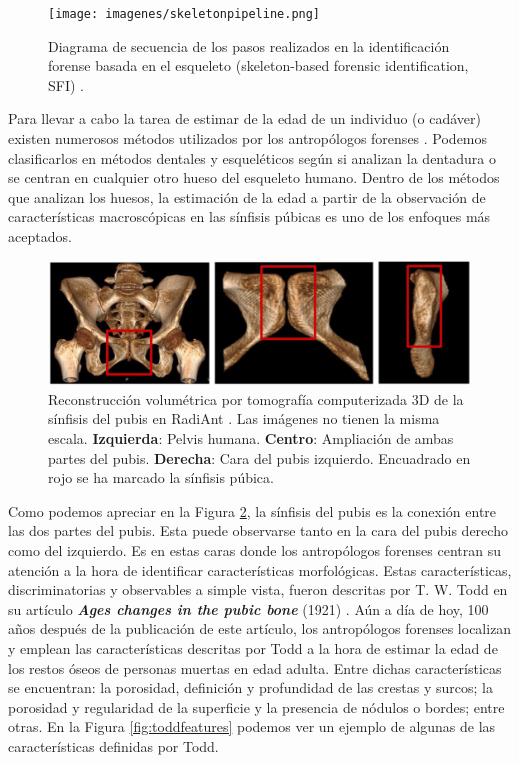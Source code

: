 \begin{figure}[ht!]
    \centering
    \texttt{[image: imagenes/skeletonpipeline.png]}
    \caption[Diagrama de secuencia de los pasos realizados en la identificación forense basada en el esqueleto.]{Diagrama de secuencia de los pasos realizados en la identificación forense basada en el esqueleto (skeleton-based forensic identification, SFI) \cite{mesejo2020survey}.}
    \label{fig:skeletonpipeline}
\end{figure}

Para llevar a cabo la tarea de estimar de la edad de un individuo (o cadáver) existen numerosos métodos utilizados por los antropólogos forenses \cite{hanihara1978estimation}. Podemos clasificarlos en métodos dentales y esqueléticos según si analizan la dentadura o se centran en cualquier otro hueso del esqueleto humano. Dentro de los métodos que analizan los huesos, la estimación de la edad a partir de la observación de características macroscópicas en las sínfisis púbicas es uno de los enfoques más aceptados.\\

\begin{figure}[ht!]
    \centering
    \includegraphics[width=\textwidth]{imagenes/pubis.jpg}
    \caption[Reconstrucción volumétrica por tomografía computerizada 3D de la sínfisis del pubis.]{Reconstrucción volumétrica por tomografía computerizada 3D de la sínfisis del pubis en RadiAnt \cite{hisham2019quantification}. Las imágenes no tienen la misma escala. \textbf{Izquierda}: Pelvis humana. \textbf{Centro}: Ampliación de ambas partes del pubis. \textbf{Derecha}: Cara del pubis izquierdo. Encuadrado en rojo se ha marcado la sínfisis púbica.}
    \label{fig:pubis}
\end{figure}

Como podemos apreciar en la Figura \ref{fig:pubis}, la sínfisis del pubis es la conexión entre las dos partes del pubis. Esta puede observarse tanto en la cara del pubis derecho como del izquierdo. Es en estas caras donde los antropólogos forenses centran su atención a la hora de identificar características morfológicas. Estas características, discriminatorias y observables a simple vista, fueron descritas por T. W. Todd en su artículo \textbf{\textit{Ages changes in the pubic bone}} (1921) \cite{todd1921age}. Aún a día de hoy, 100 años después de la publicación de este artículo, los antropólogos forenses localizan y emplean las características descritas por Todd a la hora de estimar la edad de los restos óseos de personas muertas en edad adulta. Entre dichas características se encuentran: la porosidad, definición y profundidad de las crestas y surcos; la porosidad y regularidad de la superficie y la presencia de nódulos o bordes; entre otras. En la Figura \ref{fig:toddfeatures} podemos ver un ejemplo de algunas de las características definidas por Todd.

